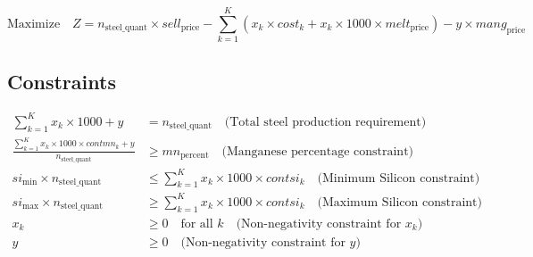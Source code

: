 \documentclass{article}
\begin{document}
\[
\text{Maximize} \quad Z = n_{\text{steel\_quant}} \times sell_{\text{price}} - \sum_{k=1}^{K} \left( x_k \times cost_k + x_k \times 1000 \times melt_{\text{price}} \right) - y \times mang_{\text{price}}
\]

\subsection*{Constraints}
\begin{align}
\sum_{k=1}^{K} x_k \times 1000 + y &= n_{\text{steel\_quant}} \quad \text{(Total steel production requirement)} \\
\frac{\sum_{k=1}^{K} x_k \times 1000 \times contmn_k + y}{n_{\text{steel\_quant}}} &\geq mn_{\text{percent}} \quad \text{(Manganese percentage constraint)} \\
si_{\text{min}} \times n_{\text{steel\_quant}} &\leq \sum_{k=1}^{K} x_k \times 1000 \times contsi_k \quad \text{(Minimum Silicon constraint)} \\
si_{\text{max}} \times n_{\text{steel\_quant}} &\geq \sum_{k=1}^{K} x_k \times 1000 \times contsi_k \quad \text{(Maximum Silicon constraint)} \\
x_k &\geq 0 \quad \text{for all } k \quad \text{(Non-negativity constraint for $x_k$)} \\
y &\geq 0 \quad \text{(Non-negativity constraint for $y$)}
\end{align}
\end{document}

